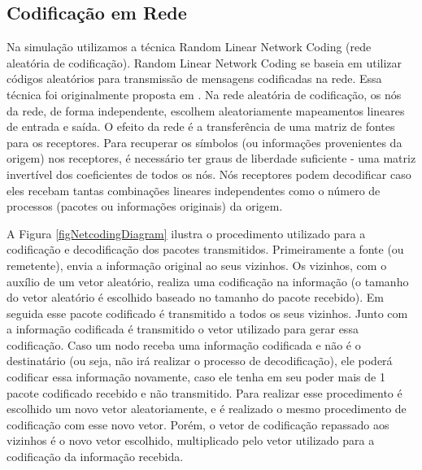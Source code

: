 \subsection{Codificação em Rede}\label{sec:codeRede}

Na simulação utilizamos a técnica Random Linear Network Coding (rede
aleatória de codificação). Random Linear Network Coding se baseia em
utilizar códigos aleatórios para transmissão de mensagens codificadas na
rede. Essa técnica foi originalmente proposta em \cite{Ho03thebenefits}.
Na rede aleatória de codificação, os nós da rede, de forma independente,
escolhem aleatoriamente mapeamentos lineares de entrada e saída. O efeito
da rede é a transferência de uma matriz de fontes para os receptores.
Para recuperar os símbolos (ou informações provenientes da origem) nos
receptores, é necessário ter graus de liberdade suficiente - uma matriz
invertível dos coeficientes de todos os nós. Nós receptores podem
decodificar caso eles recebam tantas combinações lineares independentes
como o número de processos (pacotes ou informações originais) da origem.

A Figura \ref{figNetcodingDiagram} ilustra o procedimento utilizado para
a codificação e decodificação dos pacotes transmitidos. Primeiramente a
fonte (ou remetente), envia a informação original ao seus vizinhos. Os
vizinhos, com o auxílio de um vetor aleatório, realiza uma codificação
na informação (o tamanho do vetor aleatório é escolhido baseado no
tamanho do pacote recebido). Em seguida esse pacote codificado é
transmitido a todos os seus vizinhos. Junto com a informação codificada
é transmitido o vetor utilizado para gerar essa codificação. Caso um
nodo receba uma informação codificada e não é o destinatário (ou seja, não
irá realizar o processo de decodificação), ele poderá codificar essa
informação novamente, caso ele tenha em seu poder mais de 1 pacote
codificado recebido e não transmitido. Para realizar esse procedimento é
escolhido um novo vetor aleatoriamente, e é realizado o mesmo
procedimento de codificação com esse novo vetor. Porém, o vetor de
codificação repassado aos vizinhos é o novo vetor escolhido,
multiplicado pelo vetor utilizado para a codificação da informação
recebida.



